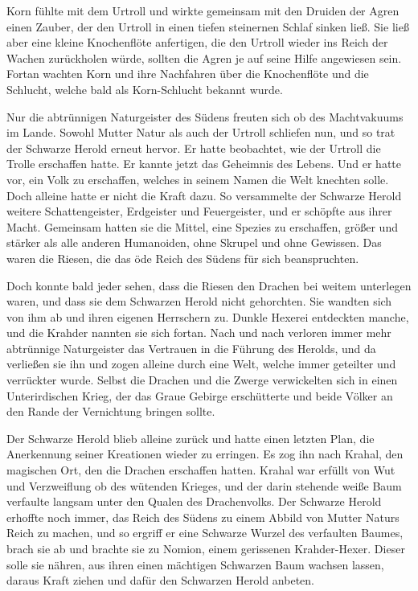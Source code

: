 \documentclass[10pt, a4paper, oneside]{book}
\begin{document}
Korn fühlte mit dem Urtroll und wirkte gemeinsam mit den Druiden der Agren einen Zauber, der den Urtroll in einen tiefen steinernen Schlaf sinken ließ. Sie ließ aber eine kleine Knochenflöte anfertigen, die den Urtroll wieder ins Reich der Wachen zurückholen würde, sollten die Agren je auf seine Hilfe angewiesen sein. Fortan wachten Korn und ihre Nachfahren über die Knochenflöte und die Schlucht, welche bald als Korn-Schlucht bekannt wurde.

Nur die abtrünnigen Naturgeister des Südens freuten sich ob des Machtvakuums im Lande. Sowohl Mutter Natur als auch der Urtroll schliefen nun, und so trat der Schwarze Herold erneut hervor. Er hatte beobachtet, wie der Urtroll die Trolle erschaffen hatte. Er kannte jetzt das Geheimnis des Lebens. Und er hatte vor, ein Volk zu erschaffen, welches in seinem Namen die Welt knechten solle. Doch alleine hatte er nicht die Kraft dazu. So versammelte der Schwarze Herold weitere Schattengeister, Erdgeister und Feuergeister, und er schöpfte aus ihrer Macht. Gemeinsam hatten sie die Mittel, eine Spezies zu erschaffen, größer und stärker als alle anderen Humanoiden, ohne Skrupel und ohne Gewissen. Das waren die Riesen, die das öde Reich des Südens für sich beanspruchten.

Doch konnte bald jeder sehen, dass die Riesen den Drachen bei weitem unterlegen waren, und dass sie dem Schwarzen Herold nicht gehorchten. Sie wandten sich von ihm ab und ihren eigenen Herrschern zu. Dunkle Hexerei entdeckten manche, und die Krahder nannten sie sich fortan. Nach und nach verloren immer mehr abtrünnige Naturgeister das Vertrauen in die Führung des Herolds, und da verließen sie ihn und zogen alleine durch eine Welt, welche immer geteilter und verrückter wurde. Selbst die Drachen und die Zwerge verwickelten sich in einen Unterirdischen Krieg, der das Graue Gebirge erschütterte und beide Völker an den Rande der Vernichtung bringen sollte.

Der Schwarze Herold blieb alleine zurück und hatte einen letzten Plan, die Anerkennung seiner Kreationen wieder zu erringen. Es zog ihn nach Krahal, den magischen Ort, den die Drachen erschaffen hatten. Krahal war erfüllt von Wut und Verzweiflung ob des wütenden Krieges, und der darin stehende weiße Baum verfaulte langsam unter den Qualen des Drachenvolks. Der Schwarze Herold erhoffte noch immer, das Reich des Südens zu einem Abbild von Mutter Naturs Reich zu machen, und so ergriff er eine Schwarze Wurzel des verfaulten Baumes, brach sie ab und brachte sie zu Nomion, einem gerissenen Krahder-Hexer. Dieser solle sie nähren, aus ihren einen mächtigen Schwarzen Baum wachsen lassen, daraus Kraft ziehen und dafür den Schwarzen Herold anbeten.
\end{document}
